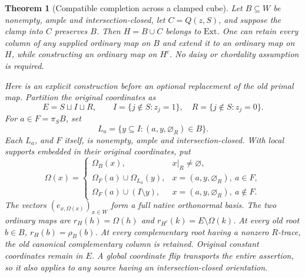 \documentclass[11pt]{article}
\newtheorem{theorem}{Theorem}[section]
\theoremstyle{definition}
\begin{document}
\begin{theorem}[Compatible completion across a clamped cube]
\label{thm:horn-gluing}
Let $B\subseteq W$ be nonempty, ample and intersection-closed, let
$C=Q(z,S)$, and suppose the clamp into $C$ preserves $B$.
Then $H=B\cup C$ belongs to $\mathrm{Ext}$. One can retain every
column of any supplied ordinary map on $B$ and extend it to an ordinary
map on $H$, while constructing an ordinary map on $H^c$.
No daisy or chordality assumption is required.

Here is an explicit construction before an optional replacement of the
old primal map. Partition the original coordinates as
\[
 E=S\sqcup I\sqcup R,\qquad
 I=\{j\notin S:z_j=1\},\quad R=\{j\notin S:z_j=0\}.
\]
For $a\in F=\pi_SB$, set
\[
 L_a=\{y\subseteq I:(a,y,\varnothing_R)\in B\}.
\]
Each $L_a$, and $F$ itself, is nonempty, ample and intersection-closed.
With local supports embedded in their original coordinates, put
\begin{equation}\label{eq:horn-glued-basis}
 \Omega(x)=
 \begin{cases}
 \Omega_B(x),&x|_R\ne\varnothing,\\
 \Omega_F(a)\cup\Omega_{L_a}(y),
       &x=(a,y,\varnothing_R),\ a\in F,\\
 \Omega_F(a)\cup(I\setminus y),
       &x=(a,y,\varnothing_R),\ a\notin F.
 \end{cases}
\end{equation}
The vectors $(e_{x,\Omega(x)})_{x\in W}$ form a full native orthonormal
basis. The two ordinary
maps are $r_H(h)=\Omega(h)$ and $r_{H^c}(k)=E\setminus\Omega(k)$.
At every old root $b\in B$, $r_H(b)=\rho_B(b)$.
At every complementary root having a nonzero $R$-trace, the old canonical
complementary column is retained. Original constant coordinates remain
in $E$. A global coordinate flip transports the entire assertion, so it
also applies to any source having an intersection-closed orientation.
\end{theorem}
\end{document}
